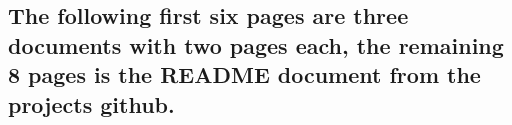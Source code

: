 \newpage
\begin{appendices}
  \chapter{The following first six pages are three documents with two pages each, the remaining 8 pages is the README document from the projects github\cite{FigmaConverter2021}.}





\end{appendices}
